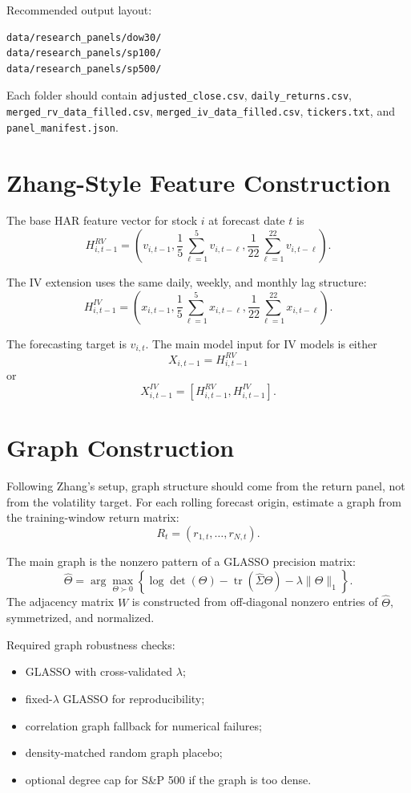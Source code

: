 \documentclass[11pt,a4paper]{article}
\begin{document}
Recommended output layout:
\begin{verbatim}
data/research_panels/dow30/
data/research_panels/sp100/
data/research_panels/sp500/
\end{verbatim}
Each folder should contain \texttt{adjusted\_close.csv}, \texttt{daily\_returns.csv}, \texttt{merged\_rv\_data\_filled.csv}, \texttt{merged\_iv\_data\_filled.csv}, \texttt{tickers.txt}, and \texttt{panel\_manifest.json}.

\section{Zhang-Style Feature Construction}

The base HAR feature vector for stock \(i\) at forecast date \(t\) is
\[
H^{RV}_{i,t-1}
=
\left(
v_{i,t-1},
\frac{1}{5}\sum_{\ell=1}^{5}v_{i,t-\ell},
\frac{1}{22}\sum_{\ell=1}^{22}v_{i,t-\ell}
\right).
\]

The IV extension uses the same daily, weekly, and monthly lag structure:
\[
H^{IV}_{i,t-1}
=
\left(
x_{i,t-1},
\frac{1}{5}\sum_{\ell=1}^{5}x_{i,t-\ell},
\frac{1}{22}\sum_{\ell=1}^{22}x_{i,t-\ell}
\right).
\]

The forecasting target is \(v_{i,t}\). The main model input for IV models is either
\[
X_{i,t-1}=H^{RV}_{i,t-1}
\]
or
\[
X^{IV}_{i,t-1}=\left[H^{RV}_{i,t-1},H^{IV}_{i,t-1}\right].
\]

\section{Graph Construction}

Following Zhang's setup, graph structure should come from the return panel, not from the volatility target. For each rolling forecast origin, estimate a graph from the training-window return matrix:
\[
R_t=(r_{1,t},\ldots,r_{N,t}).
\]

The main graph is the nonzero pattern of a GLASSO precision matrix:
\[
\widehat{\Theta}
=
\arg\max_{\Theta \succ 0}
\left\{
\log\det(\Theta)-\operatorname{tr}(\widehat{\Sigma}\Theta)-\lambda\|\Theta\|_1
\right\}.
\]
The adjacency matrix \(W\) is constructed from off-diagonal nonzero entries of \(\widehat{\Theta}\), symmetrized, and normalized.

Required graph robustness checks:
\begin{itemize}[leftmargin=*]
  \item GLASSO with cross-validated \(\lambda\);
  \item fixed-\(\lambda\) GLASSO for reproducibility;
  \item correlation graph fallback for numerical failures;
  \item density-matched random graph placebo;
  \item optional degree cap for S\&P 500 if the graph is too dense.
\end{itemize}
\end{document}
